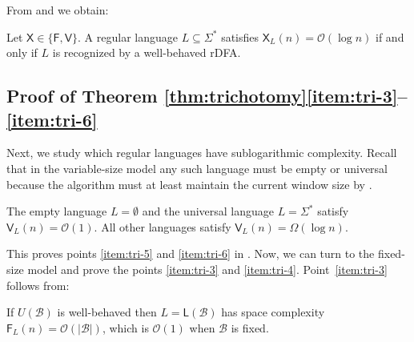 \documentclass{article}\usepackage[a4paper,margin=20mm]{geometry}
\newcommand{\B}{\mathcal{B}}
\renewcommand{\O}{\mathcal{O}}
\newcommand{\F}{\mathsf{F}}
\renewcommand{\L}{\mathsf{L}}
\newcommand{\V}{\mathsf{V}}
\newcommand{\X}{\mathsf{X}}
\begin{document}
From  and  we obtain:
\begin{corollary}
	\label{cor:log-wb}
	Let $\X \in \{ \F,\V\}$.
	A regular language $L \subseteq \Sigma^*$ satisfies $\X_L(n) = \O(\log n)$
	if and only if $L$ is recognized by a well-behaved rDFA.
\end{corollary}


\subsection{Proof of Theorem \ref{thm:trichotomy}\ref{item:tri-3}--\ref{item:tri-6}}

\label{subsec:const}

Next, we study which regular languages have sublogarithmic complexity.
Recall that in the variable-size model any such language must be empty or universal
because the algorithm must at least 
maintain the current window size by .

\begin{corollary}
	\label{cor:v-triv}
	The empty language $L = \emptyset$ and the universal language $L = \Sigma^*$ satisfy $\V_L(n) = \O(1)$.
	All other languages satisfy $\V_L(n) = \Omega(\log n)$.
\end{corollary}

This proves points \ref{item:tri-5} and \ref{item:tri-6}
in .
Now, we can turn to the fixed-size model
and prove the points \ref{item:tri-3} and \ref{item:tri-4}. Point~\ref{item:tri-3} follows from:

\begin{proposition}
	\label{prop:r-wb}
	If $U(\B)$ is well-behaved then $L = \L(\B)$ has space complexity $\F_L(n) = \O(|\B|)$,
	which is $\O(1)$ when $\B$ is fixed.
\end{proposition}
\end{document}
